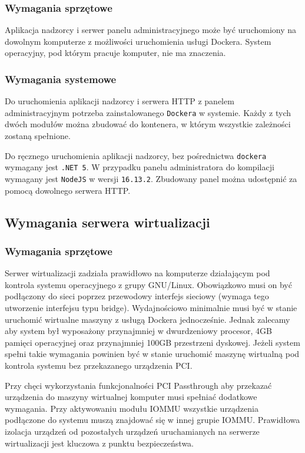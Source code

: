 \documentclass[../opis-rozwiazania.tex]{subfiles}
\begin{document}
\subsubsection{Wymagania sprzętowe}
Aplikacja nadzorcy i serwer panelu administracyjnego może być uruchomiony na dowolnym komputerze z możliwości uruchomienia usługi Dockera.
System operacyjny, pod którym pracuje komputer, nie ma znaczenia.

\subsubsection{Wymagania systemowe}
Do uruchomienia aplikacji nadzorcy i serwera HTTP z panelem administracyjnym potrzeba zainstalowanego \texttt{Dockera} w systemie.
Każdy z tych dwóch modułów można zbudować do kontenera, w którym wszystkie zależności zostaną spełnione.

Do ręcznego uruchomienia aplikacji nadzorcy, bez pośrednictwa \texttt{dockera} wymagany jest \texttt{.NET 5}. W przypadku panelu administratora do kompilacji wymagany jest \texttt{NodeJS} w wersji \texttt{16.13.2}. Zbudowany panel można udostępnić za pomocą dowolnego serwera HTTP.

\subsection{Wymagania serwera wirtualizacji}
\label{system_requirements.virtsrv_rquirements}

\subsubsection{Wymagania sprzętowe}
Serwer wirtualizacji zadziała prawidłowo na komputerze działającym pod kontrola systemu operacyjnego z grupy GNU/Linux.
Obowiązkowo musi on być podłączony do sieci poprzez przewodowy interfejs sieciowy (wymaga tego utworzenie interfejsu typu bridge).
Wydajnościowo minimalnie musi być w stanie uruchomić wirtualne maszyny z usługą Dockera jednocześnie.
Jednak zalecamy aby system był wyposażony przynajmniej w dwurdzeniowy procesor, 4GB pamięci operacyjnej oraz przynajmniej 100GB przestrzeni dyskowej.
Jeżeli system spełni takie wymagania powinien być w stanie uruchomić maszynę wirtualną pod kontrola systemu bez przekazanego urządzenia PCI.

Przy chęci wykorzystania funkcjonalności PCI Passthrough aby przekazać urządzenia do maszyny wirtualnej komputer musi spełniać dodatkowe wymagania.
Przy aktywowaniu modułu IOMMU wszystkie urządzenia podłączone do systemu muszą znajdować się w innej grupie IOMMU.
Prawidłowa izolacja urządzeń od pozostałych urządzeń uruchamianych na serwerze wirtualizacji jest kluczowa z punktu bezpieczeństwa.
\end{document}
